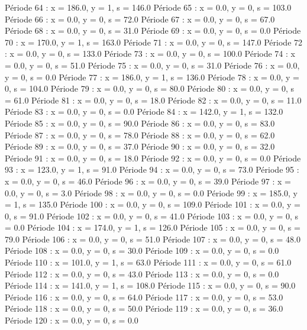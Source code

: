 Période 64 : x = 186.0, y = 1, s = 146.0
Période 65 : x = 0.0, y = 0, s = 103.0
Période 66 : x = 0.0, y = 0, s = 72.0
Période 67 : x = 0.0, y = 0, s = 67.0
Période 68 : x = 0.0, y = 0, s = 31.0
Période 69 : x = 0.0, y = 0, s = 0.0
Période 70 : x = 170.0, y = 1, s = 163.0
Période 71 : x = 0.0, y = 0, s = 147.0
Période 72 : x = 0.0, y = 0, s = 133.0
Période 73 : x = 0.0, y = 0, s = 100.0
Période 74 : x = 0.0, y = 0, s = 51.0
Période 75 : x = 0.0, y = 0, s = 31.0
Période 76 : x = 0.0, y = 0, s = 0.0
Période 77 : x = 186.0, y = 1, s = 136.0
Période 78 : x = 0.0, y = 0, s = 104.0
Période 79 : x = 0.0, y = 0, s = 80.0
Période 80 : x = 0.0, y = 0, s = 61.0
Période 81 : x = 0.0, y = 0, s = 18.0
Période 82 : x = 0.0, y = 0, s = 11.0
Période 83 : x = 0.0, y = 0, s = 0.0
Période 84 : x = 142.0, y = 1, s = 132.0
Période 85 : x = 0.0, y = 0, s = 90.0
Période 86 : x = 0.0, y = 0, s = 83.0
Période 87 : x = 0.0, y = 0, s = 78.0
Période 88 : x = 0.0, y = 0, s = 62.0
Période 89 : x = 0.0, y = 0, s = 37.0
Période 90 : x = 0.0, y = 0, s = 32.0
Période 91 : x = 0.0, y = 0, s = 18.0
Période 92 : x = 0.0, y = 0, s = 0.0
Période 93 : x = 123.0, y = 1, s = 91.0
Période 94 : x = 0.0, y = 0, s = 73.0
Période 95 : x = 0.0, y = 0, s = 46.0
Période 96 : x = 0.0, y = 0, s = 39.0
Période 97 : x = 0.0, y = 0, s = 3.0
Période 98 : x = 0.0, y = 0, s = 0.0
Période 99 : x = 185.0, y = 1, s = 135.0
Période 100 : x = 0.0, y = 0, s = 109.0
Période 101 : x = 0.0, y = 0, s = 91.0
Période 102 : x = 0.0, y = 0, s = 41.0
Période 103 : x = 0.0, y = 0, s = 0.0
Période 104 : x = 174.0, y = 1, s = 126.0
Période 105 : x = 0.0, y = 0, s = 79.0
Période 106 : x = 0.0, y = 0, s = 51.0
Période 107 : x = 0.0, y = 0, s = 48.0
Période 108 : x = 0.0, y = 0, s = 30.0
Période 109 : x = 0.0, y = 0, s = 0.0
Période 110 : x = 101.0, y = 1, s = 63.0
Période 111 : x = 0.0, y = 0, s = 61.0
Période 112 : x = 0.0, y = 0, s = 43.0
Période 113 : x = 0.0, y = 0, s = 0.0
Période 114 : x = 141.0, y = 1, s = 108.0
Période 115 : x = 0.0, y = 0, s = 90.0
Période 116 : x = 0.0, y = 0, s = 64.0
Période 117 : x = 0.0, y = 0, s = 53.0
Période 118 : x = 0.0, y = 0, s = 50.0
Période 119 : x = 0.0, y = 0, s = 36.0
Période 120 : x = 0.0, y = 0, s = 0.0


